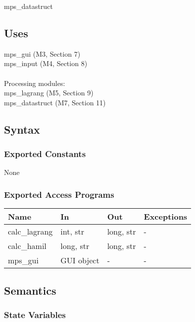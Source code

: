 \documentclass[12pt, titlepage]{article}
\begin{document}
mps\_datastruct

\subsection{Uses}

mps\_gui (M3, Section 7)\\
mps\_input (M4, Section 8)\\\\
Processing modules:\\
mps\_lagrang (M5, Section 9)\\
mps\_datastruct (M7, Section 11)\\

\subsection{Syntax}

\subsubsection{Exported Constants}

None

\subsubsection{Exported Access Programs}

\begin{center}
\begin{tabular}{p{2cm} p{4cm} p{4cm} p{2cm}}
\hline
\textbf{Name} & \textbf{In} & \textbf{Out} & \textbf{Exceptions} \\
\hline
calc\_lagrang & int, str & long, str & - \\
calc\_hamil & long, str & long, str & - \\
mps\_gui & GUI object & - & - \\
\hline
\end{tabular}
\end{center}

\subsection{Semantics}

\subsubsection{State Variables}

\end{document}
